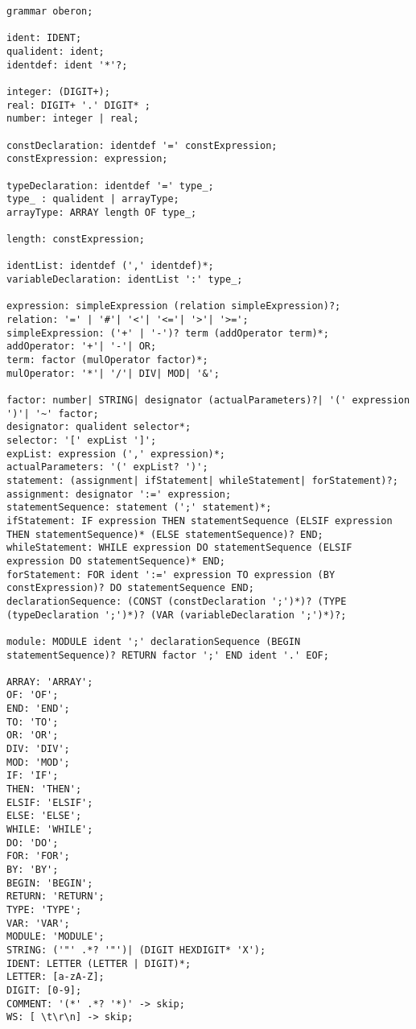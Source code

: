 \begin{center}
\begin{lstlisting}[caption = Грамматика языка Oberon]
grammar oberon;

ident: IDENT;
qualident: ident;
identdef: ident '*'?;

integer: (DIGIT+);
real: DIGIT+ '.' DIGIT* ;
number: integer | real;

constDeclaration: identdef '=' constExpression;
constExpression: expression;

typeDeclaration: identdef '=' type_;
type_ : qualident | arrayType;
arrayType: ARRAY length OF type_;

length: constExpression;

identList: identdef (',' identdef)*;
variableDeclaration: identList ':' type_;

expression: simpleExpression (relation simpleExpression)?;
relation: '=' | '#'| '<'| '<='| '>'| '>=';
simpleExpression: ('+' | '-')? term (addOperator term)*;
addOperator: '+'| '-'| OR;
term: factor (mulOperator factor)*;
mulOperator: '*'| '/'| DIV| MOD| '&';

factor: number| STRING| designator (actualParameters)?| '(' expression ')'| '~' factor;
designator: qualident selector*;
selector: '[' expList ']';
expList: expression (',' expression)*;
actualParameters: '(' expList? ')';
statement: (assignment| ifStatement| whileStatement| forStatement)?;
assignment: designator ':=' expression;
statementSequence: statement (';' statement)*;
ifStatement: IF expression THEN statementSequence (ELSIF expression THEN statementSequence)* (ELSE statementSequence)? END;
whileStatement: WHILE expression DO statementSequence (ELSIF expression DO statementSequence)* END;
forStatement: FOR ident ':=' expression TO expression (BY constExpression)? DO statementSequence END;
declarationSequence: (CONST (constDeclaration ';')*)? (TYPE (typeDeclaration ';')*)? (VAR (variableDeclaration ';')*)?;

module: MODULE ident ';' declarationSequence (BEGIN statementSequence)? RETURN factor ';' END ident '.' EOF;

ARRAY: 'ARRAY';
OF: 'OF';
END: 'END';
TO: 'TO';
OR: 'OR';
DIV: 'DIV';
MOD: 'MOD';
IF: 'IF';
THEN: 'THEN';
ELSIF: 'ELSIF';
ELSE: 'ELSE';
WHILE: 'WHILE';
DO: 'DO';
FOR: 'FOR';
BY: 'BY';
BEGIN: 'BEGIN';
RETURN: 'RETURN';
TYPE: 'TYPE';
VAR: 'VAR';
MODULE: 'MODULE';
STRING: ('"' .*? '"')| (DIGIT HEXDIGIT* 'X');
IDENT: LETTER (LETTER | DIGIT)*;
LETTER: [a-zA-Z];
DIGIT: [0-9];
COMMENT: '(*' .*? '*)' -> skip;
WS: [ \t\r\n] -> skip;
\end{lstlisting}
\end{center}

\pagebreak